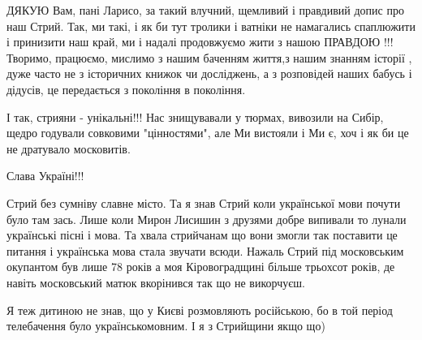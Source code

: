 \begin{itemize}
ДЯКУЮ Вам, пані Ларисо, за такий влучний, щемливий і правдивий допис про наш
Стрий. Так, ми такі, і як би тут тролики і ватніки не намагались спаплюжити і
принизити наш край, ми і надалі продовжуємо жити з нашою ПРАВДОЮ !!! Творимо,
працюємо, мислимо з нашим баченням життя,з нашим знанням історії , дуже часто
не з історичних книжок чи досліджень, а з розповідей наших бабусь і дідусів, це
передається з покоління в покоління.

І так, стрияни - унікальні!!! Нас знищувавали у тюрмах, вивозили на Сибір,
щедро годували совковими "цінностями", але Ми вистояли і Ми є, хоч і як би це
не дратувало московитів.

Слава Україні!!!

 

Стрий без сумніву славне місто. Та я знав Стрий коли української мови почути
було там зась. Лише коли Мирон Лисишин з друзями добре випивали то лунали
українські пісні і мова. Та хвала стрийчанам що вони змогли так поставити це
питання і українська мова стала звучати всюди. Нажаль Стрий під московським
окупантом був лише 78 років а моя Кіровоградщині більше трьохсот років, де
навіть московський матюк вкорінився так що не викорчуєш.

 

Я теж дитиною не знав, що у Києві розмовляють російською, бо в той період
телебачення було українськомовним. І я з Стрийщини якщо що)

\end{itemize}


